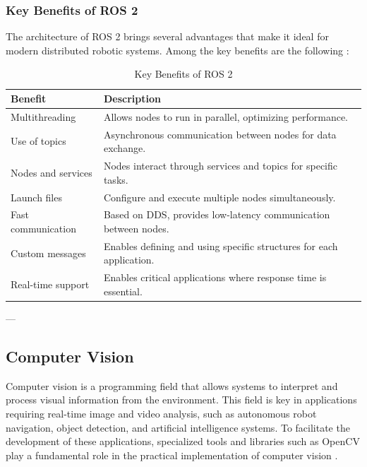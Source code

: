     \subsubsection{Key Benefits of ROS 2}
    
    The architecture of ROS 2 brings several advantages that make it ideal for modern distributed robotic systems. Among the key benefits are the following \cite{ros_docs}:  
    
    \begin{table}[h!]
    \centering
    \caption{Key Benefits of ROS 2}
    \begin{tabular}{|l|p{10cm}|}
    \hline
    \textbf{Benefit} & \textbf{Description} \\
    \hline
    Multithreading & Allows nodes to run in parallel, optimizing performance. \\
    \hline
    Use of topics & Asynchronous communication between nodes for data exchange. \\
    \hline
    Nodes and services & Nodes interact through services and topics for specific tasks. \\
    \hline
    Launch files & Configure and execute multiple nodes simultaneously. \\
    \hline
    Fast communication & Based on DDS, provides low-latency communication between nodes. \\
    \hline
    Custom messages & Enables defining and using specific structures for each application. \\
    \hline
    Real-time support & Enables critical applications where response time is essential. \\
    \hline
    \end{tabular}
    \label{table:benefits}
    \end{table}    

---

\subsection{Computer Vision}

    Computer vision is a programming field that allows systems to interpret and process visual information from the environment. This field is key in applications requiring real-time image and video analysis, such as autonomous robot navigation, object detection, and artificial intelligence systems. To facilitate the development of these applications, specialized tools and libraries such as OpenCV play a fundamental role in the practical implementation of computer vision \cite{opencv_docs}.  
    
